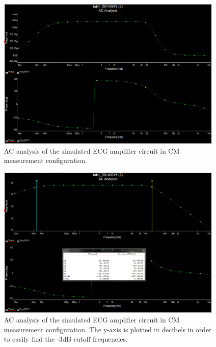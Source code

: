 \documentclass[pdftex,12pt,letterpaper]{article}
\begin{document}
\begin{figure}[H]
\begin{center}
\includegraphics[scale=.35]{CM_analysis.png}
\caption{AC analysis of the simulated ECG amplifier circuit in CM measurement configuration.}
\label{fig:CM}
\end{center}
\end{figure}

\begin{figure}[H]
\begin{center}
\includegraphics[scale=.35]{3db_analysis.png}
\caption{AC analysis of the simulated ECG amplifier circuit in CM measurement configuration. The y-axis is plotted in decibels in order to easily find the -3dB cutoff frequencies.}
\label{fig:3DB}
\end{center}
\end{figure}
\end{document}
